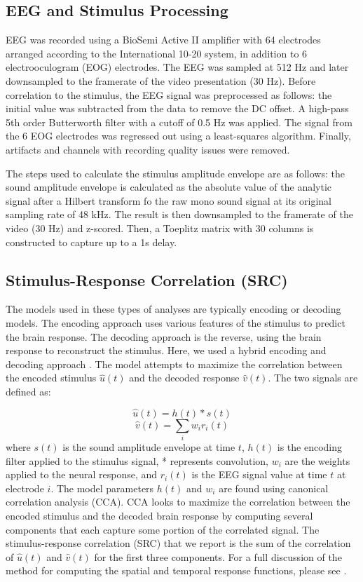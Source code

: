 \documentclass[10pt,letterpaper]{article}
\begin{document}
\subsection{EEG and Stimulus Processing}

  EEG was recorded using a BioSemi Active II amplifier with 64 electrodes 
  arranged according to the International 10-20 system, in addition to 6
  electrooculogram (EOG) electrodes. The EEG was sampled at 512 Hz and 
  later downsampled to the framerate of the video presentation (30 Hz).
  Before correlation to the stimulus, the EEG signal was preprocessed as 
  follows: the initial value was subtracted from the data to remove the 
  DC offset. A high-pass 5th order Butterworth filter with a cutoff of 
  0.5 Hz was applied. The signal from the 6 EOG electrodes was regressed 
  out using a least-squares algorithm. Finally, artifacts and channels 
  with recording quality issues were removed.

  The steps used to calculate the stimulus amplitude envelope are as follows:
  the sound amplitude envelope is calculated as the absolute value of the 
  analytic signal after a Hilbert transform fo the raw mono sound signal 
  at its original sampling rate of 48 kHz. The result is then downsampled
  to the framerate of the video (30 Hz) and z-scored. Then, a Toeplitz matrix
  with 30 columns is constructed to capture up to a 1s delay.
  
\subsection{Stimulus-Response Correlation (SRC)}

  The models used in these types of analyses are typically encoding or 
  decoding models. The encoding approach uses various features of the 
  stimulus to predict the brain response. The decoding approach is the reverse,
  using the brain response to reconstruct the stimulus. Here, we used a 
  hybrid encoding and decoding approach \cite{Dmochowski2017}. The model 
  attempts to maximize the correlation between the encoded stimulus 
  $\hat{u}(t)$ and the decoded response $\hat{v}(t)$. The two signals 
  are defined as:
  
    $$\hat{u}(t) = h(t) * s(t)$$
    $$\hat{v}(t) = \sum_{i} w_ir_i(t)$$
  where $s(t)$ is the sound amplitude envelope at time $t$, $h(t)$ is the 
  encoding filter applied to the stimulus signal, * represents convolution, 
  $w_i$ are the weights applied to the neural response, and $r_i(t)$ is the 
  EEG signal value at time $t$ at electrode $i$. The model parameters 
  $h(t)$ and $w_i$ are found using canonical correlation analysis (CCA).
  CCA looks to maximize the correlation between the encoded stimulus and the 
  decoded brain response by computing several components that each capture
  some portion of the correlated signal. The stimulus-response correlation (SRC)
  that we report is the sum of the correlation of $\hat{u}(t)$ and $\hat{v}(t)$
  for the first three components. For a full discussion of the method for 
  computing the spatial and temporal response functions, please see 
  \cite{Dmochowski2017}.
\end{document}

